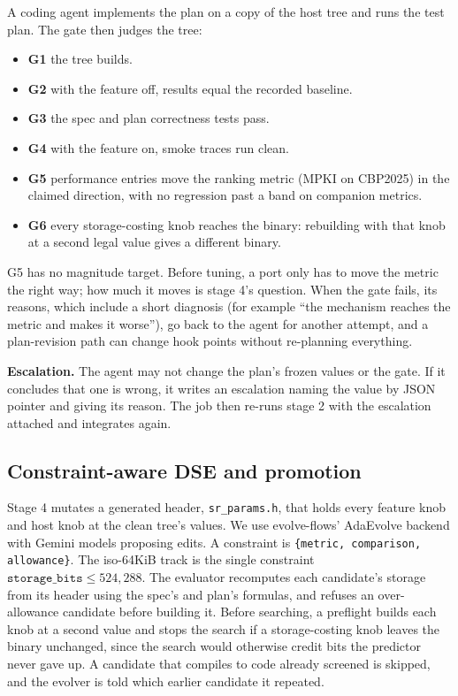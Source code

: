 \documentclass[conference]{IEEEtran}
\begin{document}
A coding agent implements the plan on a copy of the host tree and runs the test
plan. The gate then judges the tree:
\begin{itemize}
\item \textbf{G1} the tree builds.
\item \textbf{G2} with the feature off, results equal the recorded baseline.
\item \textbf{G3} the spec and plan correctness tests pass.
\item \textbf{G4} with the feature on, smoke traces run clean.
\item \textbf{G5} performance entries move the ranking metric (MPKI on CBP2025)
in the claimed direction, with no regression past a band on companion metrics.
\item \textbf{G6} every storage-costing knob reaches the binary: rebuilding
with that knob at a second legal value gives a different binary.
\end{itemize}
G5 has no magnitude target. Before tuning, a port only has to move the metric
the right way; how much it moves is stage 4's question. When the gate fails,
its reasons, which include a short diagnosis (for example ``the mechanism
reaches the metric and makes it worse''), go back to the agent for another
attempt, and a plan-revision path can change hook points without re-planning
everything.

\textbf{Escalation.} The agent may not change the plan's frozen values or the
gate. If it concludes that one is wrong, it writes an escalation naming the
value by JSON pointer and giving its reason. The job then re-runs stage 2 with
the escalation attached and integrates again.

\subsection{Constraint-aware DSE and promotion}

Stage 4 mutates a generated header, \texttt{sr\_params.h}, that holds every
feature knob and host knob at the clean tree's values. We use evolve-flows'
AdaEvolve backend with Gemini models proposing edits. A constraint is
\texttt{\{metric, comparison, allowance\}}. The iso-64KiB track is the single
constraint $\texttt{storage\_bits} \le 524{,}288$. The evaluator recomputes each
candidate's storage from its header using the spec's and plan's formulas, and
refuses an over-allowance candidate before building it. Before searching, a
preflight builds each knob at a second value and stops the search if a
storage-costing knob leaves the binary unchanged, since the search would
otherwise credit bits the predictor never gave up. A candidate that compiles to
code already screened is skipped, and the evolver is told which earlier
candidate it repeated.
\end{document}
